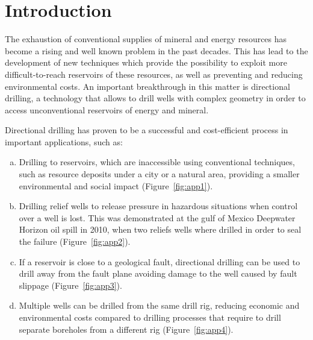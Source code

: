 %


\chapter{Introduction} \label{chap::intro}

The exhaustion of conventional supplies of mineral and energy resources has become a rising and well known problem in the past decades. This has lead to the development of new techniques which provide the possibility to exploit more difficult-to-reach reservoirs of these resources, as well as preventing and reducing environmental costs. An important breakthrough in this matter is directional drilling, a technology that allows to drill wells with complex geometry in order to access unconventional reservoirs of energy and mineral.

Directional drilling has proven to be a successful and cost-efficient process in important applications, such as:

\begin{enumerate}[(a)]
	\item Drilling to reservoirs, which are inaccessible using conventional techniques, such as resource deposits under a city or a natural area, providing a smaller environmental and social impact (Figure~\ref{fig:app1}).
	\item Drilling relief wells to release pressure in hazardous situations when control over a well is lost. This was demonstrated at the gulf of Mexico Deepwater Horizon oil spill in 2010, when two reliefs wells where drilled in order to seal the failure (Figure~\ref{fig:app2}).
	\item If a reservoir is close to a geological fault, directional drilling can be used to drill away from the fault plane avoiding damage to the well caused by fault slippage (Figure~\ref{fig:app3}).
	\item  	Multiple wells can be drilled from the same drill rig, reducing economic and environmental costs compared to drilling processes that require to drill separate boreholes from a different rig (Figure~\ref{fig:app4}).
\end{enumerate}


